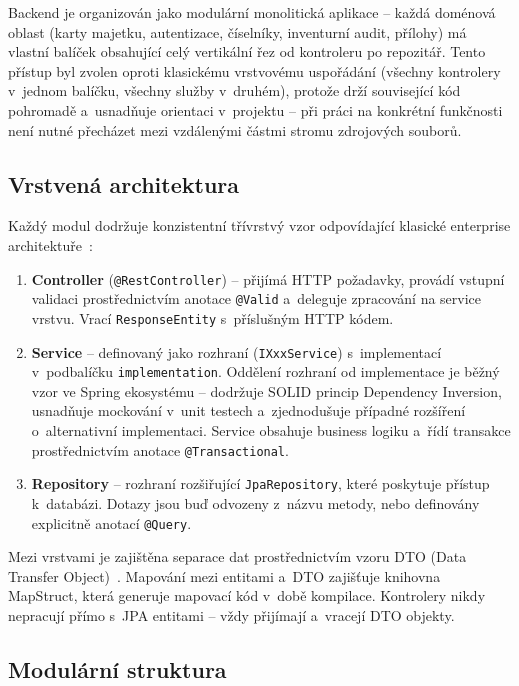 Backend je organizován jako modulární monolitická aplikace -- každá doménová oblast (karty majetku, autentizace, číselníky, inventurní audit, přílohy) má vlastní balíček obsahující celý vertikální řez od kontroleru po repozitář. Tento přístup byl zvolen oproti klasickému vrstvovému uspořádání (všechny kontrolery v~jednom balíčku, všechny služby v~druhém), protože drží související kód pohromadě a~usnadňuje orientaci v~projektu -- při práci na konkrétní funkčnosti není nutné přecházet mezi vzdálenými částmi stromu zdrojových souborů.

\subsection{Vrstvená architektura}

Každý modul dodržuje konzistentní třívrstvý vzor odpovídající klasické enterprise architektuře~\cite{fowler-eaa}:

\begin{enumerate}
	\item \textbf{Controller} (\texttt{@RestController}) -- přijímá HTTP požadavky, provádí vstupní validaci prostřednictvím anotace \texttt{@Valid} a~deleguje zpracování na service vrstvu. Vrací \texttt{ResponseEntity} s~příslušným HTTP kódem.
	\item \textbf{Service} -- definovaný jako rozhraní (\texttt{IXxxService}) s~implementací v~podbalíčku \texttt{implementation}. Oddělení rozhraní od implementace je běžný vzor ve Spring ekosystému -- dodržuje SOLID princip Dependency Inversion, usnadňuje mockování v~unit testech a~zjednodušuje případné rozšíření o~alternativní implementaci. Service obsahuje business logiku a~řídí transakce prostřednictvím anotace \texttt{@Transactional}.
	\item \textbf{Repository} -- rozhraní rozšiřující \texttt{JpaRepository}, které poskytuje přístup k~databázi. Dotazy jsou buď odvozeny z~názvu metody, nebo definovány explicitně anotací \texttt{@Query}.
\end{enumerate}

Mezi vrstvami je zajištěna separace dat prostřednictvím vzoru DTO (Data Transfer Object)~\cite{fowler-eaa}. Mapování mezi entitami a~DTO zajišťuje knihovna MapStruct, která generuje mapovací kód v~době kompilace. Kontrolery nikdy nepracují přímo s~JPA entitami -- vždy přijímají a~vracejí DTO objekty.

\subsection{Modulární struktura}

